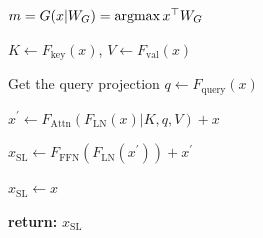 \documentclass{article}
\newcommand{\skipl}{SkipLayer\xspace}
\begin{document}


\begin{algorithm}
\small
\caption{\skipl per decoding step}\label{alg:skiplayer_decoding}
\setcounter{AlgoLine}{0}
$m = G(x|W_G)=\mathop{\mathrm{argmax}}{x^\top W_G}$

$K\leftarrow F_{\text{key}}(x)$, $V\leftarrow F_{\text{val}}(x)$

{
    Get the query projection $q\leftarrow F_{\text{query}}(x)$
    
    $x^\prime\leftarrow F_{\text{Attn}}\left(F_{\text{LN}}(x)|K, q, V\right) + x$
    
    $x_{\text{SL}}\leftarrow F_{\text{FFN}}\left(F_{\text{LN}}(x^\prime)\right) + x^\prime$
}
{
    $x_{\text{SL}}\leftarrow x$
}

\textbf{return:} $x_{\text{SL}}$
\end{algorithm}
\end{document}
